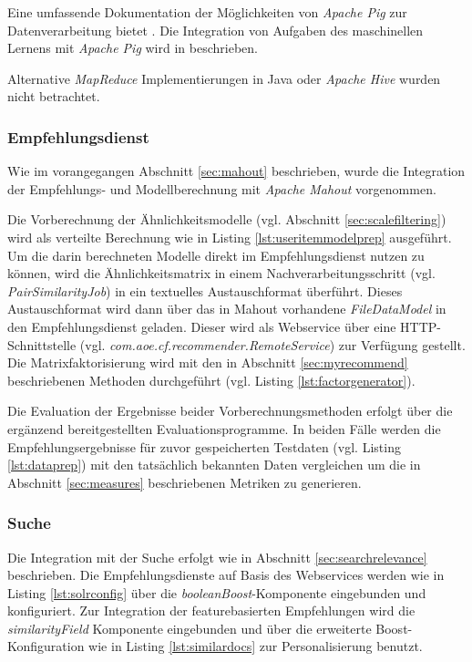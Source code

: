  

Eine umfassende Dokumentation der Möglichkeiten von \textit{Apache Pig} zur Datenverarbeitung bietet \citep{gates2011programming}. Die Integration von Aufgaben des maschinellen Lernens mit  \textit{Apache Pig} wird in  \citep{Lin2012} beschrieben.

Alternative \textit{MapReduce} Implementierungen in Java oder \textit{Apache Hive} wurden nicht betrachtet.

\subsubsection{Empfehlungsdienst} Wie im vorangegangen Abschnitt \ref{sec:mahout} beschrieben, wurde die Integration der Empfehlungs- und Modellberechnung mit \textit{Apache Mahout} vorgenommen.

Die Vorberechnung der Ähnlichkeitsmodelle (vgl. Abschnitt \ref{sec:scalefiltering}) wird als verteilte Berechnung wie in Listing \ref{lst:useritemmodelprep} ausgeführt. Um die darin berechneten Modelle direkt im Empfehlungsdienst nutzen zu können, wird die Ähnlichkeitsmatrix in einem Nachverarbeitungsschritt (vgl. \textit{PairSimilarityJob}) in ein textuelles Austauschformat überführt. Dieses Austauschformat wird dann über das in Mahout vorhandene \textit{FileDataModel} in den Empfehlungsdienst geladen. Dieser wird als Webservice über eine HTTP-Schnittstelle (vgl. \textit{com.aoe.cf.recommender.RemoteService}) zur Verfügung gestellt. Die Matrixfaktorisierung wird mit den in Abschnitt \ref{sec:myrecommend} beschriebenen Methoden durchgeführt (vgl. Listing \ref{lst:factorgenerator}).

Die Evaluation der Ergebnisse beider Vorberechnungsmethoden erfolgt über die ergänzend bereitgestellten Evaluationsprogramme. In beiden Fälle werden die Empfehlungsergebnisse für zuvor gespeicherten Testdaten (vgl. Listing \ref{lst:dataprep}) mit den tatsächlich bekannten Daten vergleichen um die in Abschnitt \ref{sec:measures} beschriebenen Metriken zu generieren.

\subsubsection{Suche}

Die Integration mit der Suche erfolgt wie in Abschnitt \ref{sec:searchrelevance} beschrieben. Die Empfehlungsdienste auf Basis des Webservices werden wie in Listing \ref{lst:solrconfig} über die \textit{booleanBoost}-Komponente eingebunden und konfiguriert. Zur Integration der featurebasierten Empfehlungen wird die \textit{similarityField} Komponente eingebunden und über die erweiterte Boost-Konfiguration wie in Listing \ref{lst:similardocs}  zur Personalisierung benutzt.

